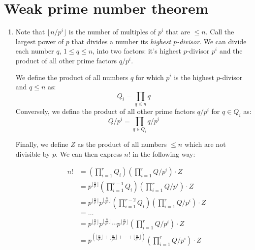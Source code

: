 \documentclass[12pt]{article}
\begin{document}
\section{Weak prime number theorem}

\begin{enumerate}
\item %
Note that $\lfloor n/p^i \rfloor$ is the number of multiples of $p^i$ that
are $\le n$. Call the largest power of $p$ that divides a number its
\textit{highest $p$-divisor}. We can divide each number $q$, $1 \le q \le n$,
into two factors:
it's highest $p$-divisor $p^i$ and the product of all other prime factors
$q/p^i$.

We define the product of all numbers $q$
for which $p^i$ is the highest $p$-divisor and $q \le n$ as:
%
\begin{displaymath}
Q_i = \prod_{q \le n} q
\end{displaymath}
%
Conversely, we define the product of all other prime factors
$q/p^i$ for $q \in Q_i$ as:
%
\begin{displaymath}
Q/p^i = \prod_{q \in Q_i} q/p^i
\end{displaymath}

Finally, we define $Z$ as the product of all numbers $\le n$ which are
not divisible by $p$.
We can then express $n!$ in the following way:

\begin{eqnarray*}
& n! & = (\prod_{i=1}^{r} Q_i)(\prod_{i=1}^{r} Q/p^i)\cdot Z\\
&    & = p^{\lfloor \frac{n}{p} \rfloor}(\prod_{i=1}^{r-1} Q_i)(\prod_{i=1}^{r} Q/p^i)\cdot Z\\
&    & = p^{\lfloor \frac{n}{p} \rfloor}p^{\lfloor \frac{n}{p^2} \rfloor}(\prod_{i=1}^{r-2} Q_i)(\prod_{i=1}^{r} Q/p^i)\cdot Z\\
&    & = \ldots\\
&    & = p^{\lfloor \frac{n}{p} \rfloor}p^{\lfloor \frac{n}{p^2} \rfloor}\cdots p^{\lfloor \frac{n}{p^r} \rfloor}(\prod_{i=1}^{r} Q/p^i)\cdot Z\\
&    & = p^{(\lfloor \frac{n}{p} \rfloor +  \lfloor \frac{n}{p^2} \rfloor +\cdots + \lfloor \frac{n}{p^r} \rfloor)}(\prod_{i=1}^{r} Q/p^i)\cdot Z
\end{eqnarray*}


\end{enumerate}
\end{document}
